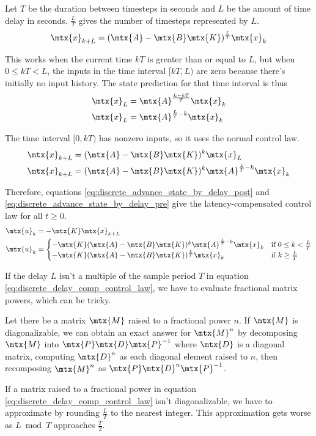 Let $T$ be the duration between timesteps in seconds and $L$ be the amount of
time delay in seconds. $\frac{L}{T}$ gives the number of timesteps represented
by $L$.
\begin{equation}
  \mtx{x}_{k+L} = (\mtx{A} - \mtx{B}\mtx{K})^\frac{L}{T} \mtx{x}_k
    \label{eq:discrete_advance_state_by_delay_post}
\end{equation}

This works when the current time $kT$ is greater than or equal to $L$, but when
$0 \leq kT < L$, the inputs in the time interval $[kT, L)$ are zero because
there's initially no input history. The state prediction for that time interval
is thus
\begin{align*}
  \mtx{x}_L &= \mtx{A}^\frac{L - kT}{T} \mtx{x}_k \\
  \mtx{x}_L &= \mtx{A}^{\frac{L}{T} - k} \mtx{x}_k
\end{align*}

The time interval $[0, kT)$ has nonzero inputs, so it uses the normal control
law.
\begin{align}
  \mtx{x}_{k + L} &= (\mtx{A} - \mtx{B}\mtx{K})^k \mtx{x}_L \nonumber \\
  \mtx{x}_{k + L} &= (\mtx{A} - \mtx{B}\mtx{K})^k
    \mtx{A}^{\frac{L}{T} - k} \mtx{x}_k
    \label{eq:discrete_advance_state_by_delay_pre}
\end{align}

Therefore, equations \eqref{eq:discrete_advance_state_by_delay_post} and
\eqref{eq:discrete_advance_state_by_delay_pre} give the latency-compensated
control law for all $t \geq 0$.
\begin{align}
  \mtx{u}_k &= -\mtx{K} \mtx{x}_{k + L} \nonumber \\
  \mtx{u}_k &=
  \begin{cases}
    -\mtx{K} (\mtx{A} - \mtx{B}\mtx{K})^k \mtx{A}^{\frac{L}{T} - k} \mtx{x}_k &
      \text{if } 0 \leq k < \frac{L}{T} \\
    -\mtx{K} (\mtx{A} - \mtx{B}\mtx{K})^\frac{L}{T} \mtx{x}_k &
      \text{if } k \geq \frac{L}{T}
  \end{cases}
  \label{eq:discrete_delay_comp_control_law}
\end{align}

If the delay $L$ isn't a multiple of the sample period $T$ in equation
\eqref{eq:discrete_delay_comp_control_law}, we have to evaluate fractional
matrix powers, which can be tricky.

Let there be a matrix $\mtx{M}$ raised to a fractional power $n$. If $\mtx{M}$
is diagonalizable, we can obtain an exact answer for $\mtx{M}^n$ by decomposing
$\mtx{M}$ into $\mtx{P}\mtx{D}\mtx{P}^{-1}$ where $\mtx{D}$ is a diagonal
matrix, computing $\mtx{D}^n$ as each diagonal element raised to $n$, then
recomposing $\mtx{M}^n$ as $\mtx{P}\mtx{D}^n\mtx{P}^{-1}$.

If a matrix raised to a fractional power in equation
\eqref{eq:discrete_delay_comp_control_law} isn't diagonalizable, we have to
approximate by rounding $\frac{L}{T}$ to the nearest integer. This approximation
gets worse as $L \bmod T$ approaches $\frac{T}{2}$.
